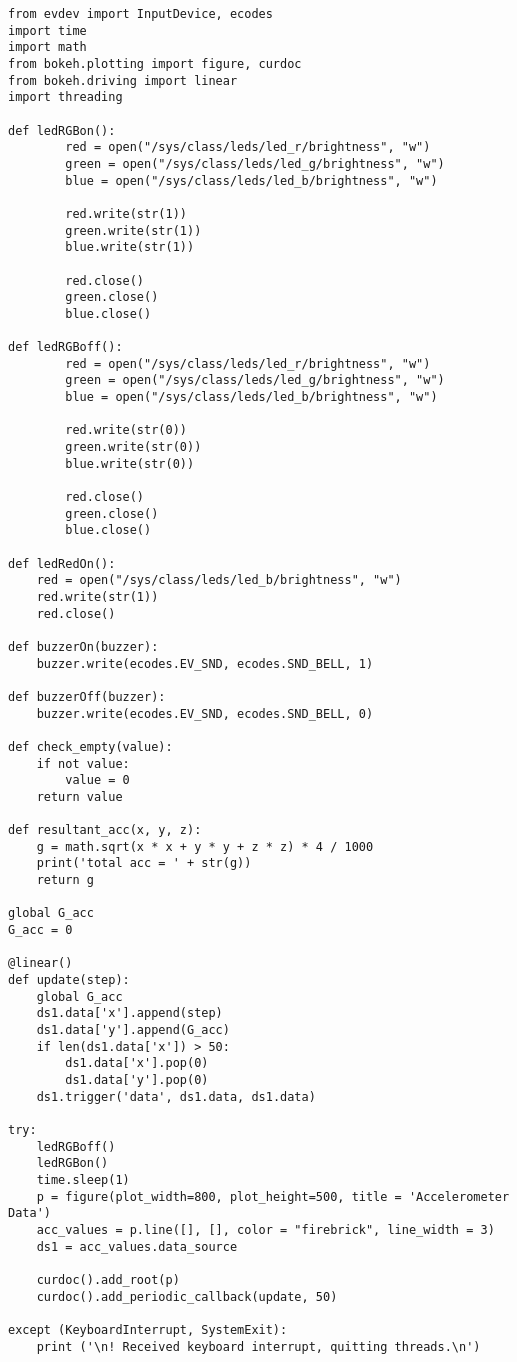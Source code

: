 \begin{verbatim}
from evdev import InputDevice, ecodes
import time
import math
from bokeh.plotting import figure, curdoc
from bokeh.driving import linear
import threading

def ledRGBon():
        red = open("/sys/class/leds/led_r/brightness", "w")
        green = open("/sys/class/leds/led_g/brightness", "w")
        blue = open("/sys/class/leds/led_b/brightness", "w")

        red.write(str(1))
        green.write(str(1))
        blue.write(str(1))

        red.close()
        green.close()
        blue.close()

def ledRGBoff():
        red = open("/sys/class/leds/led_r/brightness", "w")
        green = open("/sys/class/leds/led_g/brightness", "w")
        blue = open("/sys/class/leds/led_b/brightness", "w")

        red.write(str(0))
        green.write(str(0))
        blue.write(str(0))

        red.close()
        green.close()
        blue.close()

def ledRedOn():
    red = open("/sys/class/leds/led_b/brightness", "w")
    red.write(str(1))
    red.close()

def buzzerOn(buzzer):
    buzzer.write(ecodes.EV_SND, ecodes.SND_BELL, 1)

def buzzerOff(buzzer):
    buzzer.write(ecodes.EV_SND, ecodes.SND_BELL, 0)

def check_empty(value):
    if not value:
        value = 0
    return value

def resultant_acc(x, y, z):
    g = math.sqrt(x * x + y * y + z * z) * 4 / 1000
    print('total acc = ' + str(g))
    return g

global G_acc
G_acc = 0

@linear()
def update(step):
    global G_acc
    ds1.data['x'].append(step)
    ds1.data['y'].append(G_acc)
    if len(ds1.data['x']) > 50:
        ds1.data['x'].pop(0)
        ds1.data['y'].pop(0)
    ds1.trigger('data', ds1.data, ds1.data)

try:
    ledRGBoff()
    ledRGBon()
    time.sleep(1)
    p = figure(plot_width=800, plot_height=500, title = 'Accelerometer Data')
    acc_values = p.line([], [], color = "firebrick", line_width = 3)
    ds1 = acc_values.data_source
    
    curdoc().add_root(p)
    curdoc().add_periodic_callback(update, 50)

except (KeyboardInterrupt, SystemExit):
    print ('\n! Received keyboard interrupt, quitting threads.\n')


\end{verbatim}
